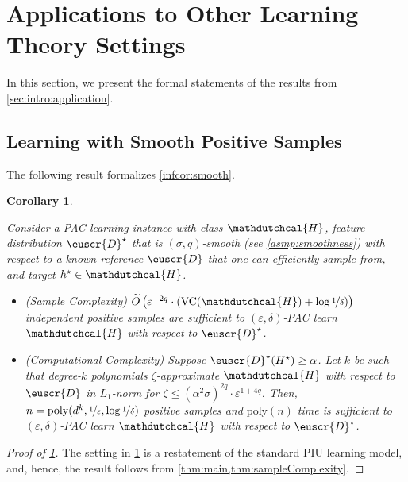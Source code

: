\documentclass[11pt]{article}
\theoremstyle{plain}
\newtheorem{corollary}[theorem]{Corollary}
\theoremstyle{definition}
\theoremstyle{remark}
\newcommand{\inparen}[1]{\left(#1\right)}
\newcommand{\nfrac}[2]{\nicefrac{#1}{#2}}
\newcommand{\poly}{\mathrm{poly}}
\newcommand{\vc}{\textrm{\rm VC}}
\newcommand{\eps}{\varepsilon}
\newcommand{\wt}[1]{\widetilde{#1}}
\newcommand{\customcal}[1]{\euscr{#1}}
\newcommand{\cD}{\customcal{D}}
\newcommand{\hypo}[1]{\mathdutchcal{#1}}
\newcommand{\hyH}{\hypo{H}}
\newcommand{\optset}{{H^\star}}
\newcommand{\cDtrue}{\cD^\star}
\newcommand{\cDgiven}{\cD}
\newcommand{\nL}{L}
\begin{document}
\section{Applications to Other Learning Theory Settings}\label{sec:application}
    In this section, we present the formal statements of the results from \cref{sec:intro:application}.
    \subsection{Learning with Smooth Positive Samples}\label{sec:application:smooth}
        The following result formalizes \cref{infcor:smooth}.
         \begin{corollary}\label{cor:smooth_classification}
                
                Consider a PAC learning instance with      
                    class $\hyH$,
                    feature distribution $\cDtrue$ that is $(\sigma,q)$-smooth (see \cref{asmp:smoothness}) with respect to a known reference $\cD$ that one can efficiently sample from, and 
                    target $h^\star\in \hyH$.  
                \begin{itemize}
                    \item[$\triangleright$] \textit{(Sample Complexity)} 
                        $\wt{O}\inparen{{\eps^{-2q}}\cdot \inparen{\vc{}(\hyH) + \log{\nfrac{1}{\delta}}}}$ independent positive samples are sufficient to $(\eps,\delta)$-PAC learn $\hyH$ with respect to $\cDtrue$.
                    \item[$\triangleright$] \textit{(Computational Complexity)}
                        Suppose $\cDtrue(\optset)\geq \alpha$.
                        Let $k$ be such that degree-$k$ polynomials $\zeta$-approximate $\hyH$ with respect to  $\cDgiven$ in $\nL_1$-norm for $\zeta\leq \inparen{{\alpha^2\sigma}}^{2q}\cdot \eps^{1+4q}$.
                        Then, $n=\poly(d^k,\nfrac{1}{\eps},\log{\nfrac{1}{\delta}})$ positive samples and $\poly(n)$ time is sufficient to $(\eps,\delta)$-PAC learn $\hyH$ with respect to $\cDtrue$.
                \end{itemize}
            \end{corollary}
            \begin{proof}[Proof of \cref{cor:smooth_classification}]
            The setting in \cref{cor:smooth_classification} is a restatement of the standard PIU learning model, and, hence, the result follows from \cref{thm:main,thm:sampleComplexity}.
        \end{proof}
        
\end{document}
